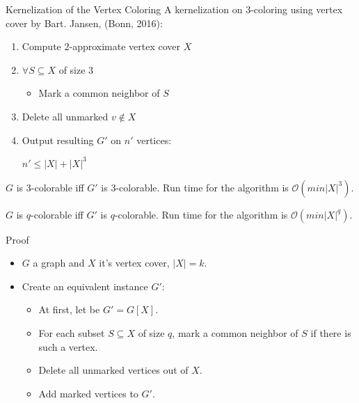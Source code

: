 \documentclass{beamer}
\begin{document}
\begin{frame}{Kernelization of the Vertex Coloring}
A kernelization on $3$-coloring using vertex cover by Bart. Jansen, (Bonn, 2016):

\begin{enumerate}
\item Compute $2$-approximate vertex cover $X$

\item $\forall S\subseteq X$ of size $3$
\begin{itemize}
\item Mark a common neighbor of $S$
\end{itemize}
\item Delete all unmarked $v \not\in X$

\item Output resulting $G'$ on $n'$ vertices:

\begin{center}
$n' \leq |X| + |X|^3$
\end{center}
\end{enumerate}

$G$ is $3$-colorable iff $G'$ is $3$-colorable. Run time for the algorithm is $\mathcal{O}(min|X|^3)$.


\begin{theorem}{\label{main theorem}}
$G$ is $q$-colorable iff $G'$ is $q$-colorable. Run time for the algorithm
is $\mathcal{O}(min|X|^q)$.
\end{theorem}
\end{frame}
\begin{frame}{Proof}
\begin{itemize}
\item $G$ a graph and $X$ it's vertex cover, $|X| = k$. 

\item Create an equivalent instance $G'$:
\begin{itemize}
\item At first, let be $G' = G[X]$. 

\item For each subset $S \subseteq X$ of size $q$, mark a common neighbor of $S$ if there is such a vertex.
\item Delete all unmarked vertices out of $X$. 
\item Add marked vertices to $G'$. 

\end{itemize}
\end{itemize}
\end{frame}
\end{document}
